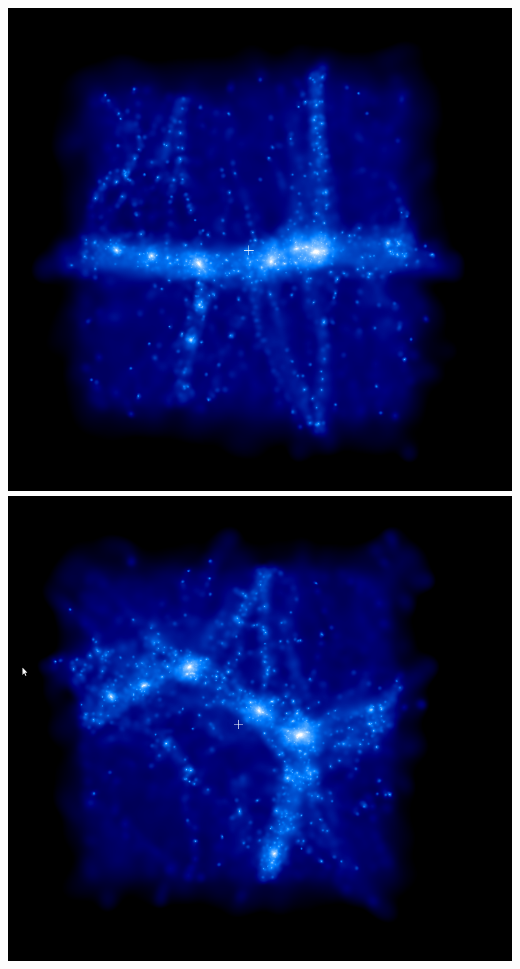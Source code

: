 \includegraphics[scale=0.25]{r128/h100/drdx_h100_r128_1/1.png} 
\includegraphics[scale=0.25]{r128/h100/drdx_h100_r128_1/2.png} 

